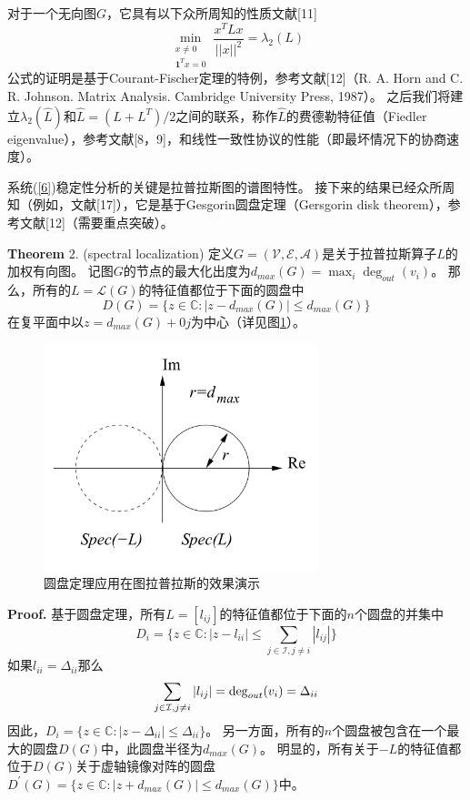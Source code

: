 \documentclass{article}
\begin{document}
对于一个无向图$G$，它具有以下众所周知的性质文献[11]
\begin{equation}
    \min_{\substack{x\ne 0\\   \mathbf{1}^Tx=0}} \frac{x^T Lx}{||x||^2}=\lambda_2(L)
    \tag{14}
    \label{14}
\end{equation}
公式的证明是基于Courant-Fischer定理的特例，参考文献[12]{\color[gray]{0.5}（R. A. Horn and C. R. Johnson. Matrix Analysis. Cambridge University Press, 1987）}。
之后我们将建立$\lambda_2(\hat{L})$和$\hat{L}=(L+L^T)/2$之间的联系，称作$\hat{L}$的费德勒特征值（Fiedler eigenvalue），参考文献[8，9]，和线性一致性协议的性能（即最坏情况下的协商速度）。

系统(\ref{6})稳定性分析的关键是拉普拉斯图的谱图特性。
接下来的结果已经众所周知（例如，文献[17]），它是基于Gesgorin圆盘定理（Gersgorin disk theorem），参考文献[12]{\color{red}（需要重点突破）}。

\noindent \textbf{Theorem} 2. (spectral localization) 定义$G=(\mathcal{V},\mathcal{E},\mathcal{A})$是关于拉普拉斯算子$L$的加权有向图。
记图$G$的节点的最大化出度为$d_{max}(G) = \max_i \deg_{out}(v_i)$。
那么，所有的$L=\mathcal{L}(G)$的特征值都位于下面的圆盘中
\begin{equation}
    D(G) = \{ z\in \mathbb{C}: |z-d_{max}(G)| \le d_{max}(G) \}
    \tag{15}
    \label{15}
\end{equation}
在复平面中以$z=d_{max}(G)+0j$为中心（详见图\ref{DiskTheorem}）。
\begin{figure}[htbp]
    \centering
    \includegraphics[width=8cm]{figures/Fig1-DiskTheorem.jpeg}
    \caption{圆盘定理应用在图拉普拉斯的效果演示}
    \label{DiskTheorem}
\end{figure}

\noindent \textbf{Proof.} 基于圆盘定理，所有$L=[l_{ij}]$的特征值都位于下面的$n$个圆盘的并集中
\begin{equation}
    D_i = \{ z\in \mathbb{C}: |z-l_{ii}| \le \sum_{j\in \mathcal{I},j\ne i}|l_{ij}| \}
    \tag{16}
    \label{16}
\end{equation}
如果$l_{ii} = \Delta_{ii}$那么
\begin{equation}
    \sum_{j\in \mathcal{I},j\ne i}|l_{ij}|=\deg_{out}(v_i) = \Delta_{ii}
    \notag
\end{equation}
因此，$D_i = \{ z\in \mathbb{C}:|z - \Delta_{ii}| \le \Delta_{ii}\}$。
另一方面，所有的$n$个圆盘被包含在一个最大的圆盘$D(G)$中，此圆盘半径为$d_{max}(G)$。
明显的，所有关于$-L$的特征值都位于$D(G)$关于虚轴镜像对阵的圆盘$D^\prime(G)=\{ z\in \mathbb{C}: |z+d_{max}(G)|\le d_{max}(G)\}$中。
\end{document}
